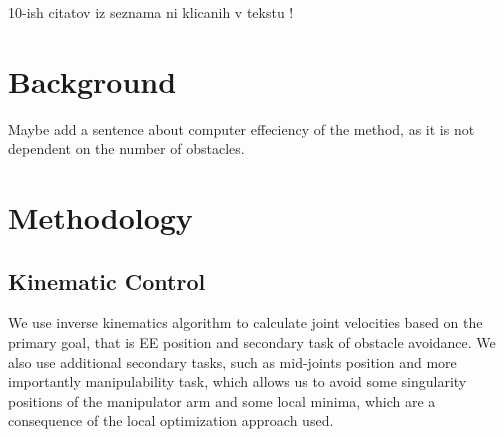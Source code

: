 \documentclass[]{article}
\begin{document}
 \alert{10-ish citatov iz seznama ni klicanih v tekstu !}
 
 


\section{Background}


\alert{Maybe add a sentence about computer effeciency of the method, as it is not dependent on the number of obstacles.}


\section{Methodology}


\subsection{Kinematic Control}

We use inverse kinematics algorithm to calculate joint velocities based on the primary goal, that is EE position and secondary task of obstacle avoidance.  We also use additional secondary tasks, such as mid-joints position and more importantly manipulability task, which allows us to avoid some singularity positions of the manipulator arm and some local minima, which are a consequence of the local optimization approach used.

\end{document}
